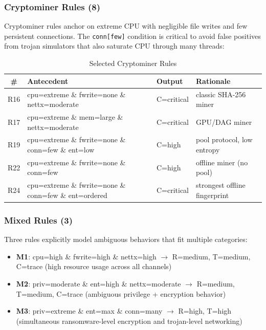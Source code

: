 \documentclass[conference]{IEEEtran}
\begin{document}
\subsubsection{Cryptominer Rules (8)}

Cryptominer rules anchor on extreme CPU with negligible file writes and
few persistent connections. The \texttt{conn[few]} condition is critical
to avoid false positives from trojan simulators that also saturate CPU
through many threads:

\begin{table}[!t]
\centering
\caption{Selected Cryptominer Rules}
\label{tab:crypto_rules}
\small\renewcommand{\arraystretch}{1.2}
\setlength{\tabcolsep}{5pt}
\begin{tabular}{@{} c p{6.8cm} l p{3.8cm} @{}}
\toprule
\textbf{\#} & \textbf{Antecedent} & \textbf{Output} & \textbf{Rationale} \\
\midrule
R16 & cpu=extreme \& fwrite=none \& nettx=moderate          & C=critical & classic SHA-256 miner \\
R17 & cpu=extreme \& mem=large \& nettx=moderate            & C=critical & GPU/DAG miner \\
R19 & cpu=extreme \& fwrite=none \& conn=few \& ent=low     & C=high     & pool protocol, low entropy \\
R22 & cpu=extreme \& fwrite=none \& conn=few                & C=high     & offline miner (no pool) \\
R24 & cpu=extreme \& fwrite=none \& conn=few \& ent=ordered & C=critical & strongest offline fingerprint \\
\bottomrule
\end{tabular}
\end{table}

\subsubsection{Mixed Rules (3)}

Three rules explicitly model ambiguous behaviors that fit multiple
categories:

\begin{itemize}[leftmargin=2em]
  \item \textbf{M1}: cpu=high \& fwrite=high \& nettx=high
        $\rightarrow$ R=medium, T=medium, C=trace
        (high resource usage across all channels)
  \item \textbf{M2}: priv=moderate \& ent=high \& nettx=moderate
        $\rightarrow$ R=medium, T=medium, C=trace
        (ambiguous privilege + encryption behavior)
  \item \textbf{M3}: priv=extreme \& ent=max \& conn=many
        $\rightarrow$ R=high, T=high
        (simultaneous ransomware-level encryption and trojan-level networking)
\end{itemize}
\end{document}
